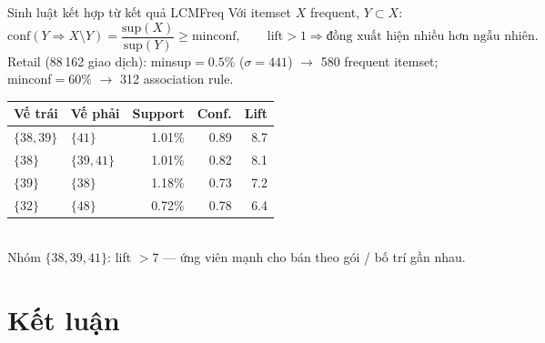 \documentclass[9pt, aspectratio=169]{beamer}
\begin{document}
\begin{frame}{Sinh luật kết hợp từ kết quả LCMFreq}
  Với itemset $X$ frequent, $Y\subset X$:
  \begin{equation}
    \mathrm{conf}(Y\Rightarrow X\setminus Y)=\frac{\mathrm{sup}(X)}{\mathrm{sup}(Y)}\geq\text{minconf},
    \qquad \mathrm{lift}>1 \Rightarrow \text{đồng xuất hiện nhiều hơn ngẫu nhiên}.
  \end{equation}
  \small Retail (88\,162 giao dịch): minsup$=0.5\%$ ($\sigma=441$) $\to$ 580
  frequent itemset; minconf$=60\%$ $\to$ 312 association rule.

  \vspace{0.4em}
  \centering\small
  \begin{tabular}{@{}llrrr@{}}
    \toprule Vế trái & Vế phải & Support & Conf. & Lift \\ \midrule
    $\{38,39\}$ & $\{41\}$    & 1.01\% & 0.89 & 8.7 \\
    $\{38\}$    & $\{39,41\}$ & 1.01\% & 0.82 & 8.1 \\
    $\{39\}$    & $\{38\}$    & 1.18\% & 0.73 & 7.2 \\
    $\{32\}$    & $\{48\}$    & 0.72\% & 0.78 & 6.4 \\
    \bottomrule
  \end{tabular}\\
  \vspace{0.2em}
  \footnotesize\color{black!55} Nhóm $\{38,39,41\}$: lift $>7$ — ứng viên
  mạnh cho bán theo gói / bố trí gần nhau.
\end{frame}

\section{Kết luận}
\end{document}
